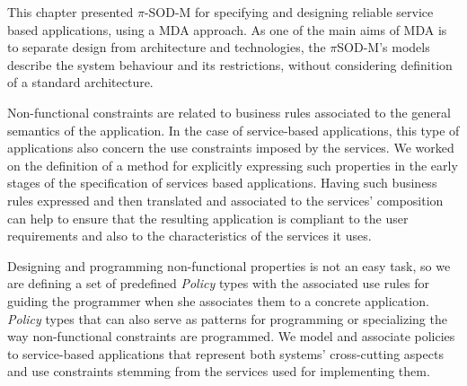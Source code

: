 This chapter presented $\pi$-SOD-M for specifying and designing reliable service
based applications, using a MDA approach. As one of the main aims of MDA is to
separate design from architecture and technologies, the $\pi$SOD-M's models
describe the system behaviour and its restrictions, without considering
definition of a standard architecture.


Non-functional constraints are related to business rules associated to the
general semantics of the application. In the case of service-based
applications, this type of applications also concern the use constraints imposed
by the services. We worked on the definition of a method for explicitly expressing
such properties in the early stages of the specification of services based
applications. Having such business rules expressed and then translated and
associated to the services' composition can help to ensure that the resulting
application is compliant to the user requirements and also to the
characteristics of the services it uses.



Designing and programming non-functional properties is not an easy task, so we
are defining a set of predefined {\em Policy} types with the associated use rules for guiding
the programmer when she associates them to a concrete application. {\em Policy}
types  that can also serve as patterns for programming or specializing the way
non-functional constraints are programmed.  We model and associate policies to 
service-based applications that represent both systems' cross-cutting aspects and use
constraints stemming from the services used for implementing them.

